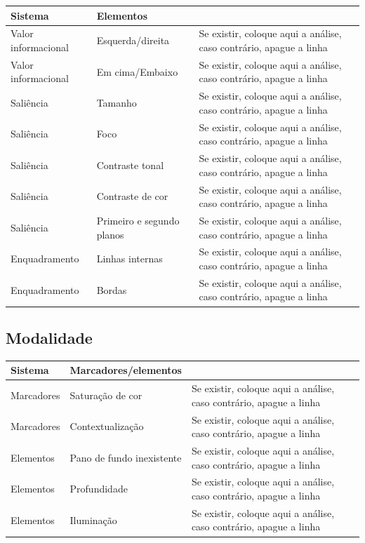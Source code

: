 \documentclass[aspectratio=169]{article}
\begin{document}
\begin{table}[H]
\begin{tabular}{p{} p{} p{}} \hline
Sistema & Elementos \\ \hline \hline
Valor informacional & Esquerda/direita & Se existir, coloque aqui a análise, caso contrário, apague a linha \\ \hline
Valor informacional & Em cima/Embaixo & Se existir, coloque aqui a análise, caso contrário, apague a linha \\ \hline
Saliência & Tamanho & Se existir, coloque aqui a análise, caso contrário, apague a linha \\ \hline
Saliência & Foco & Se existir, coloque aqui a análise, caso contrário, apague a linha \\ \hline
Saliência & Contraste tonal & Se existir, coloque aqui a análise, caso contrário, apague a linha \\ \hline
Saliência & Contraste de cor & Se existir, coloque aqui a análise, caso contrário, apague a linha \\ \hline
Saliência & Primeiro e segundo planos & Se existir, coloque aqui a análise, caso contrário, apague a linha \\ \hline
Enquadramento & Linhas internas & Se existir, coloque aqui a análise, caso contrário, apague a linha \\ \hline
Enquadramento & Bordas & Se existir, coloque aqui a análise, caso contrário, apague a linha \\ \hline
\end{tabular}
\end{table}

\subsection{Modalidade}

\begin{table}[H]
\begin{tabular}{p{} p{} p{}} \hline
Sistema & Marcadores/elementos \\ \hline \hline
Marcadores & Saturação de cor & Se existir, coloque aqui a análise, caso contrário, apague a linha \\ \hline
Marcadores & Contextualização & Se existir, coloque aqui a análise, caso contrário, apague a linha \\ \hline
Elementos & Pano de fundo inexistente & Se existir, coloque aqui a análise, caso contrário, apague a linha \\ \hline
Elementos & Profundidade & Se existir, coloque aqui a análise, caso contrário, apague a linha \\ \hline
Elementos & Iluminação & Se existir, coloque aqui a análise, caso contrário, apague a linha \\ \hline
\end{tabular}
\end{table}


%

\end{document}
